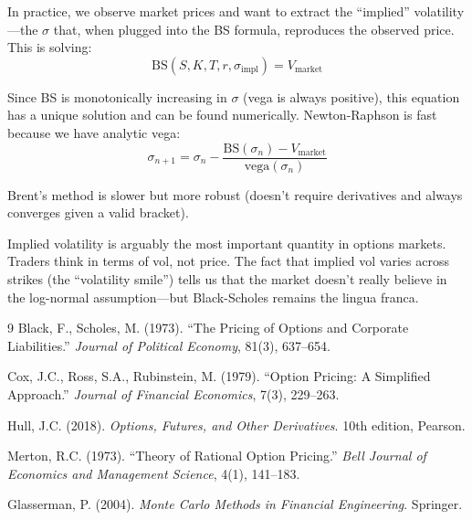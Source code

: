 \documentclass[11pt]{article}
\begin{document}
In practice, we observe market prices and want to extract the ``implied'' volatility---the $\sigma$ that, when plugged into the BS formula, reproduces the observed price. This is solving:
\[
\text{BS}(S, K, T, r, \sigma_{\text{impl}}) = V_{\text{market}}
\]

Since BS is monotonically increasing in $\sigma$ (vega is always positive), this equation has a unique solution and can be found numerically. Newton-Raphson is fast because we have analytic vega:
\[
\sigma_{n+1} = \sigma_n - \frac{\text{BS}(\sigma_n) - V_{\text{market}}}{\text{vega}(\sigma_n)}
\]

Brent's method is slower but more robust (doesn't require derivatives and always converges given a valid bracket).

Implied volatility is arguably the most important quantity in options markets. Traders think in terms of vol, not price. The fact that implied vol varies across strikes (the ``volatility smile'') tells us that the market doesn't really believe in the log-normal assumption---but Black-Scholes remains the lingua franca.

\begin{thebibliography}{9}
 Black, F., Scholes, M. (1973). ``The Pricing of Options and Corporate Liabilities.'' \textit{Journal of Political Economy}, 81(3), 637--654.

 Cox, J.C., Ross, S.A., Rubinstein, M. (1979). ``Option Pricing: A Simplified Approach.'' \textit{Journal of Financial Economics}, 7(3), 229--263.

 Hull, J.C. (2018). \textit{Options, Futures, and Other Derivatives}. 10th edition, Pearson.

 Merton, R.C. (1973). ``Theory of Rational Option Pricing.'' \textit{Bell Journal of Economics and Management Science}, 4(1), 141--183.

 Glasserman, P. (2004). \textit{Monte Carlo Methods in Financial Engineering}. Springer.
\end{thebibliography}
\end{document}
